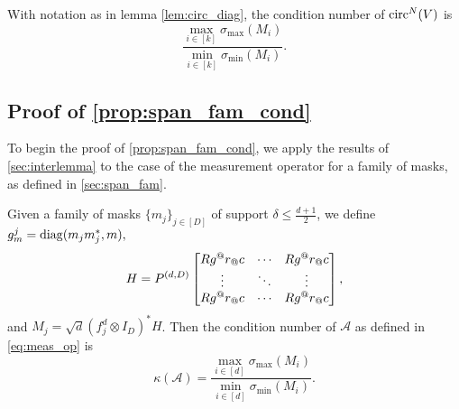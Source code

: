 \begin{corollary}
  With notation as in lemma \ref{lem:circ_diag}, the condition number of $\operatorname{circ}^N(V)$ is \[\dfrac{\max\limits_{i \in [k]} \sigma_{\max} (M_i)}{\min\limits_{i \in [k]} \sigma_{\min} (M_i)}.\] \label{cor:circ_diag_condition}
\end{corollary}

\subsection{Proof of \cref{prop:span_fam_cond}}

To begin the proof of \cref{prop:span_fam_cond}, we apply the results of \cref{sec:interlemma} to the case of the measurement operator for a family of masks, as defined in \cref{sec:span_fam}.

\begin{proposition}
  Given a family of masks $\{m_j\}_{j \in [D]}$ of support $\delta \le \frac{d + 1}{2}$, we define $g_m^j = \operatorname{diag}(m_j m_j^*, m),$ \[H = P^{(d, D)} \cornmatfun{R g^@r_@c}{1}{D}{1 - \delta}{\delta - 1}%
  ,\] and $M_j = \sqrt{d}\left(f_j^d \otimes I_D\right)^* H$.  Then the condition number of $\mathcal{A}$ as defined in \eqref{eq:meas_op} is \[\kappa(\mathcal{A}) = \dfrac{\max\limits_{i \in [d]} \sigma_{\max} (M_i)}{\min\limits_{i \in [d]} \sigma_{\min} (M_i)}.\] \label{prop:meas_cond}
\end{proposition}

